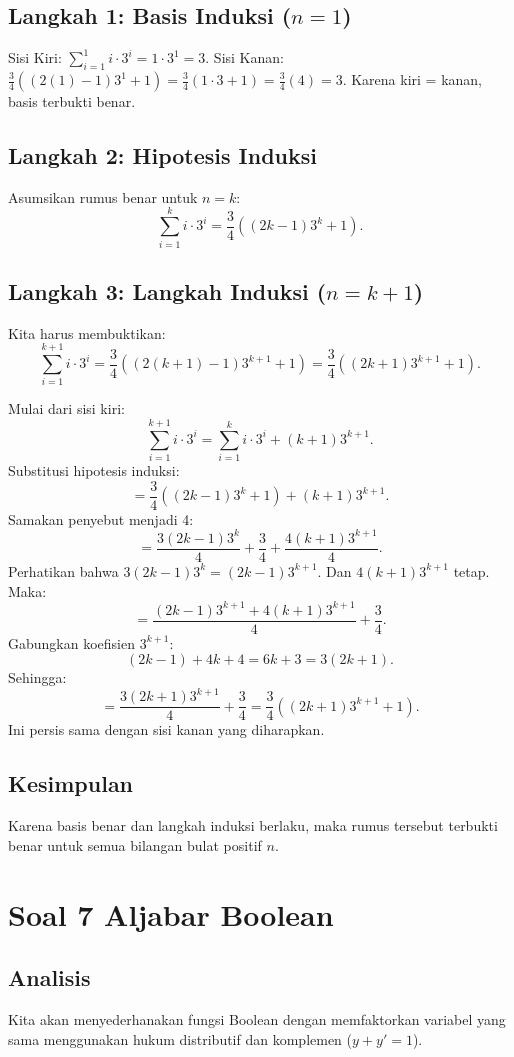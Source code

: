 \documentclass[12pt,a4paper]{article}
\begin{document}
\subsection*{Langkah 1: Basis Induksi ($n=1$)}
Sisi Kiri: $\sum_{i=1}^{1} i \cdot 3^i = 1 \cdot 3^1 = 3$.
Sisi Kanan: $\frac{3}{4}((2(1)-1)3^1 + 1) = \frac{3}{4}(1 \cdot 3 + 1) = \frac{3}{4}(4) = 3$.
Karena kiri = kanan, basis terbukti benar.

\subsection*{Langkah 2: Hipotesis Induksi}
Asumsikan rumus benar untuk $n = k$:
\[
\sum_{i=1}^{k} i \cdot 3^i = \frac{3}{4}\left((2k-1)3^k + 1\right).
\]

\subsection*{Langkah 3: Langkah Induksi ($n = k+1$)}
Kita harus membuktikan:
\[
\sum_{i=1}^{k+1} i \cdot 3^i = \frac{3}{4}\left((2(k+1)-1)3^{k+1} + 1\right) = \frac{3}{4}\left((2k+1)3^{k+1} + 1\right).
\]

Mulai dari sisi kiri:
\[
\sum_{i=1}^{k+1} i \cdot 3^i = \sum_{i=1}^{k} i \cdot 3^i + (k+1)3^{k+1}.
\]
Substitusi hipotesis induksi:
\[
= \frac{3}{4}\left((2k-1)3^k + 1\right) + (k+1)3^{k+1}.
\]
Samakan penyebut menjadi 4:
\[
= \frac{3(2k-1)3^k}{4} + \frac{3}{4} + \frac{4(k+1)3^{k+1}}{4}.
\]
Perhatikan bahwa $3(2k-1)3^k = (2k-1)3^{k+1}$. Dan $4(k+1)3^{k+1}$ tetap. Maka:
\[
= \frac{(2k-1)3^{k+1} + 4(k+1)3^{k+1}}{4} + \frac{3}{4}.
\]
Gabungkan koefisien $3^{k+1}$:
\[
(2k-1) + 4k + 4 = 6k + 3 = 3(2k+1).
\]
Sehingga:
\[
= \frac{3(2k+1)3^{k+1}}{4} + \frac{3}{4} = \frac{3}{4}\left((2k+1)3^{k+1} + 1\right).
\]
Ini persis sama dengan sisi kanan yang diharapkan.

\subsection*{Kesimpulan}
Karena basis benar dan langkah induksi berlaku, maka rumus tersebut terbukti benar untuk semua bilangan bulat positif $n$. 

\newpage
\section*{Soal 7 Aljabar Boolean}
\subsection*{Analisis}
Kita akan menyederhanakan fungsi Boolean dengan memfaktorkan variabel yang sama menggunakan hukum distributif dan komplemen ($y + y' = 1$).
\end{document}
